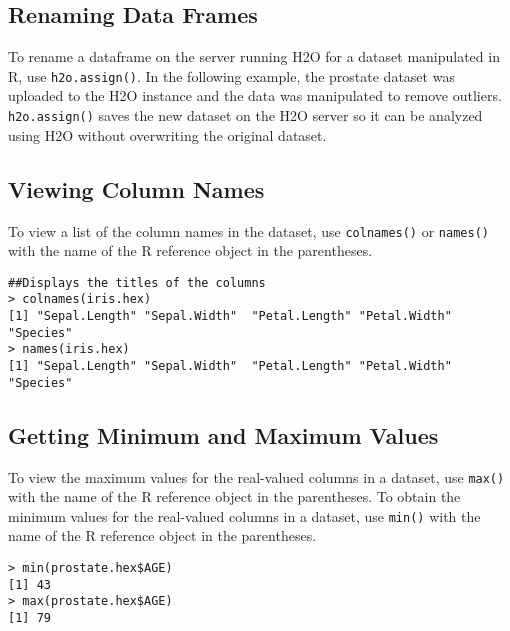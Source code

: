 {{\subsection{Renaming Data Frames}
To rename a dataframe on the server running H2O for a dataset manipulated in R, use {\texttt{h2o.assign()}}. In the following example, the prostate dataset was uploaded to the H2O instance and the data was manipulated to remove outliers. {\texttt{h2o.assign()}} saves the new dataset on the H2O server so it can be analyzed using H2O without overwriting the original dataset.

\waterExampleInR
\medskip


\subsection{Viewing Column Names}
To view a list of the column names in the dataset, use {\texttt{colnames()}} or {\texttt{names()}} with the name of the R reference object in the parentheses.
\newpage
\waterExampleInR
\medskip

\begin{lstlisting}[style=R]
##Displays the titles of the columns
> colnames(iris.hex)
[1] "Sepal.Length" "Sepal.Width"  "Petal.Length" "Petal.Width"  "Species"
> names(iris.hex)
[1] "Sepal.Length" "Sepal.Width"  "Petal.Length" "Petal.Width"  "Species"
\end{lstlisting}

\subsection{Getting Minimum and Maximum Values}

To view the maximum values for the real-valued columns in a dataset, use {\texttt{max()}} with the name of the R reference object in the parentheses.
To obtain the minimum values for the real-valued columns in a dataset, use {\texttt{min()}} with the name of the R reference object in the parentheses.

\waterExampleInR
\medskip

\begin{lstlisting}[style=R]
> min(prostate.hex$AGE)
[1] 43
> max(prostate.hex$AGE)
[1] 79
\end{lstlisting}

}}
